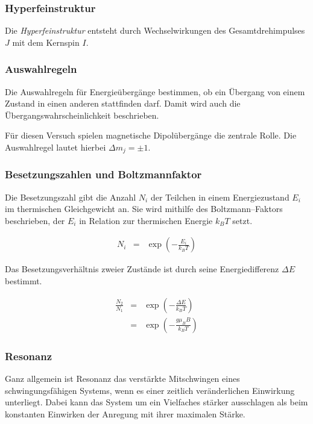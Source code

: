 \documentclass[12pt,a4paper]{scrartcl}
\numberwithin{equation}{section} %
\begin{document}
\subsubsection{Hyperfeinstruktur}
Die \emph{Hyperfeinstruktur} entsteht durch Wechselwirkungen des Gesamtdrehimpulses $J$ mit dem Kernspin $I$.

\subsubsection{Auswahlregeln}
Die Auswahlregeln für Energieübergänge bestimmen, ob ein Übergang von einem Zustand in einen anderen stattfinden darf. Damit wird auch die Übergangswahrscheinlichkeit beschrieben.

Für diesen Versuch spielen magnetische Dipolübergänge die zentrale Rolle. Die Auswahlregel lautet hierbei $\Delta m_j = \pm 1$.

\subsubsection{Besetzungszahlen und Boltzmannfaktor}
Die Besetzungszahl gibt die Anzahl $N_i$ der Teilchen in einem Energiezustand $E_i$ im thermischen Gleichgewicht an. Sie wird mithilfe des Boltzmann--Faktors beschrieben, der $E_i$ in Relation zur thermischen Energie $k_BT$ setzt.

\begin{eqnarray}
	N_i &=& \exp(-\frac{E_i}{k_BT})
\end{eqnarray}

\noindent
Das Besetzungsverhältnis zweier Zustände ist durch seine Energiedifferenz $\Delta E$ bestimmt.

\begin{eqnarray}
	\frac{N_2}{N_1} &=& \exp(-\frac{\Delta E}{k_BT}) \\
		&=& \exp(-\frac{g\mu _B B}{k_BT})
\end{eqnarray}

\hypertarget{resonanz}{\subsubsection{Resonanz}\label{resonanz}}

Ganz allgemein ist Resonanz das verstärkte Mitschwingen eines schwingungsfähigen Systems, wenn es einer zeitlich veränderlichen Einwirkung unterliegt. Dabei kann das System um ein Vielfaches stärker ausschlagen als beim konstanten Einwirken der Anregung mit ihrer maximalen Stärke.
\end{document}
